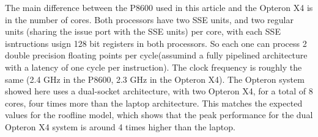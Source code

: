 The main difference between the P8600 used in this article and the Opteron X4 is in the number of cores. Both processors have two SSE units, and two regular units (sharing the issue port with the SSE units) per core, with each SSE isntructions usign 128 bit registers in both processors. So each one can process 2 double precision floating points per cycle(assumind a fully pipelined architecture with a latency of one cycle per instruction). The clock frequency is roughly the same (2.4 GHz in the P8600, 2.3 GHz in the Opteron X4). The Opteron system showed here uses a dual-socket architecture, with two Opteron X4, for a total of 8 cores, four times more than the laptop architecture. This matches the expected values for the roofline model, which shows that the peak performance for the dual Opteron X4 system is around 4 times higher than the laptop.
